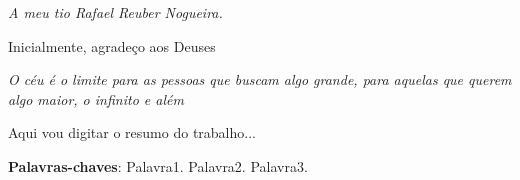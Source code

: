 \documentclass[12pt,openright,oneside,a4paper,ruledheader,pnumromarab,english]{abntex2}
\begin{document}
\begin{dedicatoria}
   \vspace*{\fill}
	\begin{flushright}

\noindent \emph{A meu tio Rafael Reuber Nogueira.}

	\end{flushright}
\end{dedicatoria}
\begin{agradecimentos}

Inicialmente, agradeço aos Deuses 

\end{agradecimentos}


\begin{epigrafe}
    \vspace*{\fill}
	\begin{flushright}
	

\textit{O céu é o limite para as pessoas que buscam algo grande, para aquelas que querem algo maior, o infinito e além}

	\end{flushright}

\end{epigrafe}


\begin{resumo} 
 
Aqui vou digitar o resumo do trabalho...

 \vspace{\onelineskip}
\noindent
 \textbf{Palavras-chaves}: Palavra1. Palavra2. Palavra3.
\end{resumo}
\end{document}
